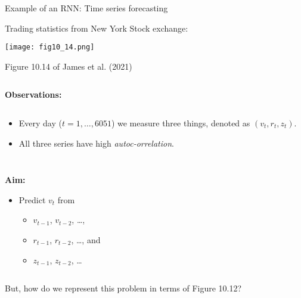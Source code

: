 \documentclass[
  10pt,
  ignorenonframetext,
]{beamer}
\providecommand{\tightlist}{%
  \setlength{\itemsep}{0pt}\setlength{\parskip}{0pt}}
\begin{document}
\begin{frame}
\begin{block}{Example of an RNN: Time series forecasting}
\protect\hypertarget{example-of-an-rnn-time-series-forecasting}{}
\vspace{2mm}

Trading statistics from New York Stock exchange:

\centering

\texttt{[image: fig10\_14.png]}

\scriptsize Figure 10.14 of James et al. (2021)
\end{block}
\end{frame}

\begin{frame}
\(~\)

\textbf{Observations: }

\(~\)

\begin{itemize}
\item
  Every day (\(t=1,\ldots, 6051\)) we measure three things, denoted as
  \((v_t, r_t, z_t)\).
\item
  All three series have high \emph{autoc-orrelation}.
\end{itemize}

\(~\)

\(~\)

\textbf{Aim:}

\begin{itemize}
\tightlist
\item
  Predict \(v_t\) from

  \begin{itemize}
  \tightlist
  \item
    \(v_{t-1}\), \(v_{t-2}\), \ldots,
  \item
    \(r_{t-1}\), \(r_{t-2}\), \ldots, and
  \item
    \(z_{t-1}\), \(z_{t-2}\), \ldots{}
  \end{itemize}
\end{itemize}

\(~\)

But, how do we represent this problem in terms of Figure 10.12?
\end{frame}
\end{document}
